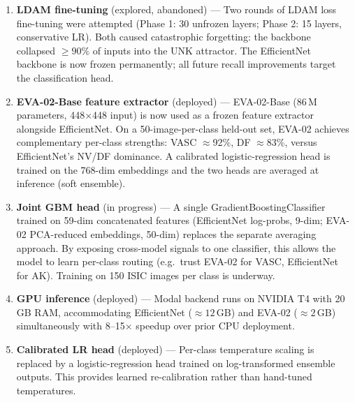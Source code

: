 \documentclass[11pt, letterpaper]{article}
\begin{document}
\begin{enumerate}[leftmargin=1.6em, itemsep=4pt]
  \item \textbf{LDAM fine-tuning} (explored, abandoned) ---
        Two rounds of LDAM loss \cite{cao2019learning} fine-tuning were attempted
        (Phase 1: 30 unfrozen layers; Phase 2: 15 layers, conservative LR).
        Both caused catastrophic forgetting: the backbone collapsed
        ${\geq}90\%$ of inputs into the UNK attractor.
        The EfficientNet backbone is now frozen permanently;
        all future recall improvements target the classification head.

  \item \textbf{EVA-02-Base feature extractor} (deployed) ---
        EVA-02-Base \cite{fang2023eva} (86\,M parameters, 448$\times$448 input)
        is now used as a frozen feature extractor alongside EfficientNet.
        On a 50-image-per-class held-out set, EVA-02 achieves complementary
        per-class strengths: VASC $\approx$92\%, DF $\approx$83\%,
        versus EfficientNet's NV/DF dominance.
        A calibrated logistic-regression head is trained on the 768-dim embeddings
        and the two heads are averaged at inference (soft ensemble).

  \item \textbf{Joint GBM head} (in progress) ---
        A single GradientBoostingClassifier trained on 59-dim concatenated
        features (EfficientNet log-probs, 9-dim; EVA-02 PCA-reduced embeddings,
        50-dim) replaces the separate averaging approach.
        By exposing cross-model signals to one classifier, this allows the model
        to learn per-class routing (e.g.\ trust EVA-02 for VASC, EfficientNet for AK).
        Training on 150 ISIC images per class is underway.

  \item \textbf{GPU inference} (deployed) ---
        Modal backend runs on NVIDIA T4 with 20\,GB RAM,
        accommodating EfficientNet (${\approx}12$\,GB) and EVA-02 (${\approx}2$\,GB)
        simultaneously with 8--15$\times$ speedup over prior CPU deployment.

  \item \textbf{Calibrated LR head} (deployed) ---
        Per-class temperature scaling is replaced by a logistic-regression head
        trained on log-transformed ensemble outputs. This provides learned
        re-calibration rather than hand-tuned temperatures.
\end{enumerate}
\end{document}

